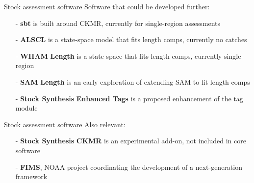 \documentclass[aspectratio=169,fleqn]{beamer}
\begin{document}

\begin{frame}{Stock assessment software}
  Software that could be developed further:\\[3ex]
  \begin{itemize}
    \item[-] {\darkgreen\bf sbt} is built around CKMR, currently for
    single-region assessments\\[3ex]
    \item[-] {\darkgreen\bf ALSCL} is a state-space model that fits length
    comps, currently no catches\\[3ex]
    \item[-] {\darkgreen\bf WHAM$\,$\raisebox{0.15ex}{+}$\,$Length} is a
    state-space that fits length comps, currently single-region\\[3ex]
    \item[-] {\darkgreen\bf SAM$\,$\raisebox{0.15ex}{+}$\,$Length} is an early
    exploration of extending SAM to fit length comps\\[3ex]
    \item[-] {\darkgreen\bf Stock Synthesis$\,$\raisebox{0.15ex}{+}$\,$Enhanced
      Tags} is a proposed enhancement of the tag module\\[2ex]
  \end{itemize}
\end{frame}


\begin{frame}{Stock assessment software}
  Also relevant:\\[4ex]
  \begin{itemize}
    \item[-] {\darkgreen\bf Stock Synthesis$\,$\raisebox{0.15ex}{+}$\,$CKMR} is
    an experimental add-on, not included in core software\\[4ex]
    \item[-] {\darkgreen\bf FIMS}, NOAA project coordinating the development of
    a next-generation framework\\[6ex]
  \end{itemize}
\end{frame}

\end{document}
